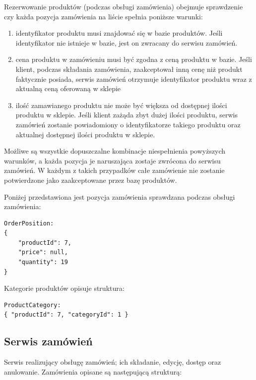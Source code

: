 \documentclass[11pt,a4paper,twoside]{article}
\begin{document}
Rezerwowanie produktów (podczas obsługi zamówienia) obejmuje sprawdzenie czy każda pozycja zamówienia na liście spełnia poniższe warunki:
\begin{enumerate}
\item identyfikator produktu musi znajdować się w bazie produktów. Jeśli identyfikator nie istnieje w bazie, jest on zwracany do serwisu zamówień.
\item cena produktu w zamówieniu musi być zgodna z ceną produktu w bazie. Jeśli klient, podczas składania zamówienia, zaakceptował inną cenę niż produkt faktycznie posiada, serwis zamówień otrzymuje identyfikator produktu wraz z aktualną ceną oferowaną w sklepie
\item ilość zamawianego produktu nie może być większa od dostępnej ilości produktu w sklepie. Jeśli klient zażąda zbyt dużej ilości produktu, serwis zamówień zostanie powiadomiony o identyfikatorze takiego produktu oraz aktualnej dostępnej ilości produktu w sklepie.
\end{enumerate}

Możliwe są wszystkie dopuszczalne kombinacje niespełnienia powyższych warunków, a każda pozycja je naruszająca zostaje zwrócona do serwisu zamówień. W każdym z takich przypadków całe zamówienie nie zostanie potwierdzone jako zaakceptowane przez bazę produktów. 

Poniżej przedstawiona jest pozycja zamówienia sprawdzana podczas obsługi zamówienia:

\begin{lstlisting}
OrderPosition:
{
	"productId": 7,
    "price": null,
    "quantity": 19
}
\end{lstlisting}
\vspace{-20pt}

Kategorie produktów opisuje struktura:
\begin{lstlisting}
ProductCategory:
{ "productId": 7, "categoryId": 1 }
\end{lstlisting}
\vspace{-20pt}


\newpage
\subsection{Serwis zamówień}
Serwis realizujący obsługę zamówień; ich składanie, edycję, dostęp oraz anulowanie. Zamówienia opisane są następującą strukturą:
\end{document}
